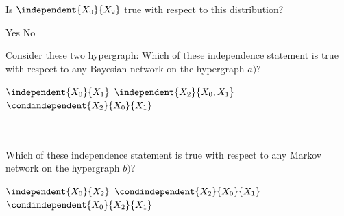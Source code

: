 \documentclass[12pt,answers]{exam}
\begin{document}
\begin{questions}
\begin{checkboxes}
        \end{checkboxes}
        Is $\independent{\catvariableof{0}}{\catvariableof{2}}$ true with respect to this distribution? \\
        \begin{oneparcheckboxes}
            \correctchoice Yes
            \choice No
        \end{oneparcheckboxes}

        \newpage
        \question
        Consider these two hypergraph:
        Which of these independence statement is true with respect to any Bayesian network on the hypergraph $a)$?\\
        \begin{oneparcheckboxes}
            \correctchoice $\independent{\catvariableof{0}}{\catvariableof{1}}$
            \choice $\independent{\catvariableof{2}}{\catvariableof{0},\catvariableof{1}}$
            \choice $\condindependent{\catvariableof{2}}{\catvariableof{0}}{\catvariableof{1}}$
        \end{oneparcheckboxes}\\
        \medskip \\
        Which of these independence statement is true with respect to any Markov network on the hypergraph $b)$?\\
        \begin{oneparcheckboxes}
            \choice $\independent{\catvariableof{0}}{\catvariableof{2}}$
            \correctchoice $\condindependent{\catvariableof{2}}{\catvariableof{0}}{\catvariableof{1}}$
            \correctchoice $\condindependent{\catvariableof{0}}{\catvariableof{2}}{\catvariableof{1}}$
        \end{oneparcheckboxes}
    \end{questions}
\end{document}
